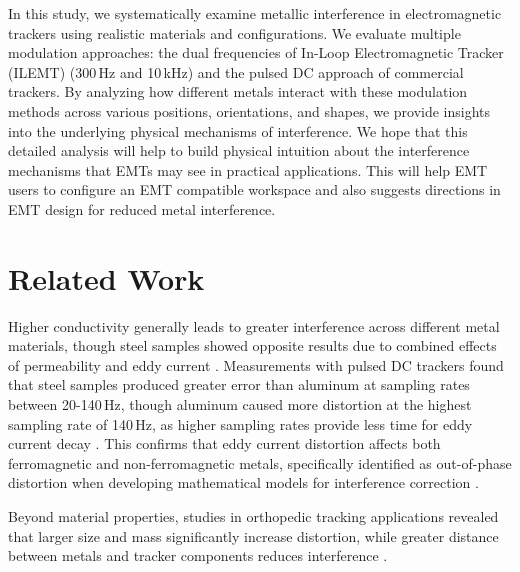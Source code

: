 \documentclass[journal,twoside,web]{ieeecolor}
\begin{document}
In this study, we systematically examine metallic interference in electromagnetic trackers using realistic materials and configurations. We evaluate multiple modulation approaches: the dual frequencies of In-Loop Electromagnetic Tracker (ILEMT) \cite{maclachlan_electromagnetic_2016, maclachlan_toward_2017} (300\,Hz and 10\,kHz) and the pulsed DC approach of commercial trackers. By analyzing how different metals interact with these modulation methods across various positions, orientations, and shapes, we provide insights into the underlying physical mechanisms of interference. We hope that this detailed analysis will help to build physical intuition about the interference mechanisms that EMTs may see in practical applications. This will help EMT users to configure an EMT compatible workspace and also suggests directions in EMT design for reduced metal interference.

\section{Related Work}

Higher conductivity generally leads to greater interference across different metal materials, though steel samples showed opposite results due to combined effects of permeability and eddy current \cite{stevens_minimizing_2010, lascalza_effect_2003}. Measurements with pulsed DC trackers found that steel samples produced greater error than aluminum at sampling rates between 20-140\,Hz, though aluminum caused more distortion at the highest sampling rate of 140\,Hz, as higher sampling rates provide less time for eddy current decay \cite{lascalza_effect_2003}. This confirms that eddy current distortion affects both ferromagnetic and non-ferromagnetic metals, specifically identified as out-of-phase distortion when developing mathematical models for interference correction \cite{cavaliere_enhancing_2023}.

Beyond material properties, studies in orthopedic tracking applications revealed that larger size and mass significantly increase distortion, while greater distance between metals and tracker components reduces interference \cite{stevens_minimizing_2010}. 
\end{document}
